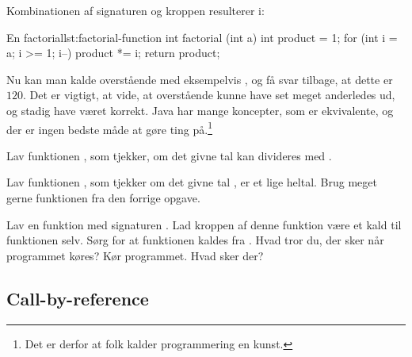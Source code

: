 		Kombinationen af signaturen og kroppen resulterer i:

		\begin{JavaCode}{En \gls{factorial}}{lst:factorial-function}
			int factorial (int a) {
				int product = 1;
				for (int i = a; i >= 1; i--)
					product *= i;
				return product;
			}
		\end{JavaCode}

        Nu kan man kalde overstående med eksempelvis
        , og få svar tilbage, at dette er
        \(120\). Det er vigtigt, at vide, at overstående kunne have set
        meget anderledes ud, og stadig have været korrekt. Java har
        mange koncepter, som er ekvivalente, og der er ingen bedste
        måde at gøre ting på.\footnote{Det er derfor at folk kalder
        programmering en kunst.}

        \begin{exercise}
            Lav funktionen ,
            som tjekker, om det givne tal  kan
            divideres med .
        \end{exercise}

        \begin{exercise}
            Lav funktionen , som
            tjekker om det givne tal , er et lige
            heltal.  Brug meget gerne funktionen
             fra den forrige opgave.
        \end{exercise}

        \begin{exercise}
            Lav en funktion med signaturen . Lad
            kroppen af denne funktion være et kald til funktionen
            selv. Sørg for at funktionen kaldes fra .
            Hvad tror du, der sker når programmet køres? Kør
            programmet. Hvad sker der?
        \end{exercise}

    \subsection{Call-by-reference}


